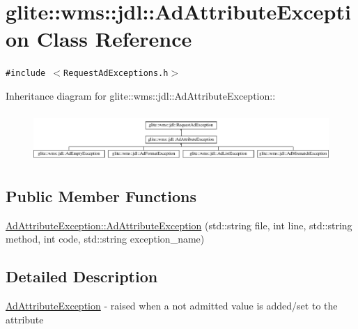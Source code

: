 \hypertarget{classglite_1_1wms_1_1jdl_1_1AdAttributeException}{
\section{glite::wms::jdl::Ad\-Attribute\-Exception Class Reference}
\label{classglite_1_1wms_1_1jdl_1_1AdAttributeException}
}
{\tt \#include $<$Request\-Ad\-Exceptions.h$>$}

Inheritance diagram for glite::wms::jdl::Ad\-Attribute\-Exception::\begin{figure}[H]
\begin{center}
\leavevmode
\includegraphics[height=1.89189cm]{classglite_1_1wms_1_1jdl_1_1AdAttributeException}
\end{center}
\end{figure}
\subsection*{Public Member Functions}
\begin{CompactItemize}
\item 
\hyperlink{classglite_1_1wms_1_1jdl_1_1AdAttributeException_a0}{Ad\-Attribute\-Exception::Ad\-Attribute\-Exception} (std::string file, int line, std::string method, int code, std::string exception\_\-name)
\end{CompactItemize}


\subsection{Detailed Description}
\hyperlink{classglite_1_1wms_1_1jdl_1_1AdAttributeException}{Ad\-Attribute\-Exception} - raised when a not admitted value is added/set to the attribute 



